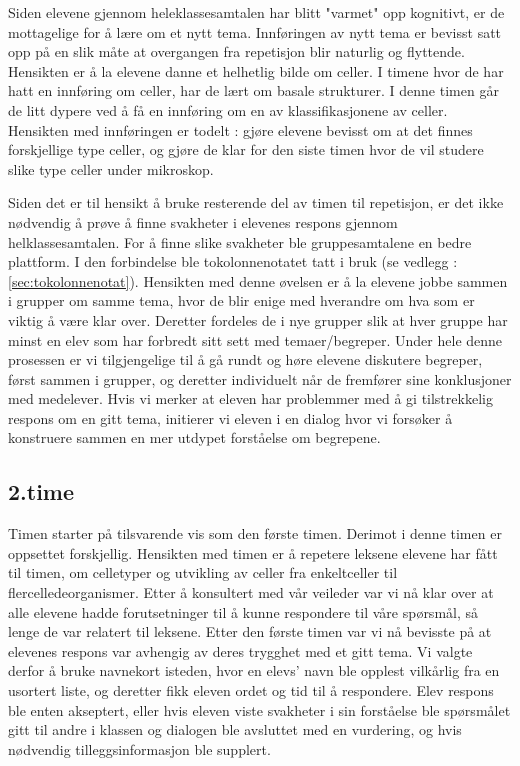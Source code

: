 \documentclass[main.tex]{subfiles}
\begin{document}
Siden elevene gjennom heleklassesamtalen har blitt "varmet" opp kognitivt, er de mottagelige for å 
lære om et nytt tema. Innføringen av nytt tema er bevisst satt opp på en slik måte at overgangen 
fra repetisjon blir naturlig og flyttende. Hensikten er å la elevene danne et helhetlig bilde om
celler. I timene hvor de har hatt en innføring om celler, har de lært om basale strukturer.
I denne timen går de litt dypere ved å få en innføring om en av klassifikasjonene av celler.
Hensikten med innføringen er todelt : gjøre elevene bevisst om at det finnes forskjellige type
celler, og gjøre de klar for den siste timen hvor de vil studere slike type celler under mikroskop.

Siden det er til hensikt å bruke resterende del av timen til repetisjon, er det ikke nødvendig å 
prøve å finne svakheter i elevenes respons gjennom helklassesamtalen. For å finne slike svakheter 
ble gruppesamtalene en bedre plattform. I den forbindelse ble tokolonnenotatet tatt i bruk (se 
vedlegg : \ref{sec:tokolonnenotat}). Hensikten med denne øvelsen er å la elevene jobbe sammen
i grupper om samme tema, hvor de blir enige med hverandre om hva som er viktig å være klar over. 
Deretter fordeles de i nye grupper slik at hver gruppe har minst en elev som har forbredt sitt sett 
med temaer/begreper. Under hele denne prosessen er vi tilgjengelige til å gå rundt og høre elevene 
diskutere begreper, først sammen i grupper, og deretter individuelt når de fremfører sine 
konklusjoner med medelever. Hvis vi merker at eleven har problemmer med å gi tilstrekkelig 
respons om en gitt tema, initierer vi eleven i en dialog hvor vi forsøker å konstruere sammen en 
mer utdypet forståelse om begrepene. 

\subsection*{2.time}

Timen starter på tilsvarende vis som den første timen. Derimot i denne timen er oppsettet 
forskjellig. Hensikten med timen er å repetere leksene elevene har fått til timen, om celletyper og
utvikling av celler fra enkeltceller til flercelledeorganismer. Etter å konsultert med vår veileder 
var vi nå klar over at alle elevene hadde forutsetninger til å kunne respondere til våre spørsmål, 
så lenge de var relatert til leksene. Etter den første timen var vi nå bevisste på at elevenes 
respons var avhengig av deres trygghet med et gitt tema. Vi valgte derfor å bruke navnekort 
isteden, hvor en elevs' navn ble opplest vilkårlig fra en usortert liste, og deretter fikk eleven 
ordet og tid til å respondere. Elev respons ble enten akseptert, eller hvis eleven viste svakheter
i sin forståelse ble spørsmålet gitt til andre i klassen og dialogen ble avsluttet med en vurdering,
og hvis nødvendig tilleggsinformasjon ble supplert. 
\end{document}
